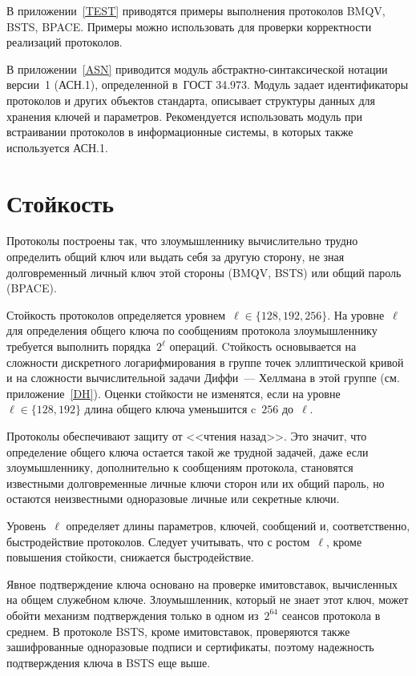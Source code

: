 В приложении~\ref{TEST} приводятся примеры выполнения 
протоколов BMQV, BSTS, BPACE.
Примеры можно использовать для проверки корректности реализаций 
протоколов.

В приложении~\ref{ASN} приводится модуль
абстрактно-синтаксической нотации версии~1 (АСН.1),
определенной в~ГОСТ 34.973.
Модуль задает идентификаторы протоколов и других объектов 
стандарта, описывает структуры данных для хранения 
ключей и параметров.
%
Рекомендуется использовать модуль 
при встраивании протоколов в информационные системы, 
в которых также используется АСН.1.

\section{Стойкость}\label{COMMON.Strength}

Протоколы построены так, что злоумышленнику 
вычислительно трудно определить общий ключ или 
выдать себя за другую сторону, не зная долговременный 
личный ключ этой стороны (BMQV, BSTS) или общий пароль (BPACE).

Стойкость протоколов определяется уровнем~$\ell\in\{128,192,256\}$.
%
На уровне~$\ell$ для определения общего ключа по сообщениям
протокола злоумышленнику требуется выполнить 
порядка~$2^\ell$ операций. 
%
Cтойкость основывается на сложности дискретного логарифмирования 
в группе точек эллиптической кривой и на сложности вычислительной задачи 
Диффи~--- Хеллмана в этой группе (см. приложение~\ref{DH}).
%
Оценки стойкости не изменятся, если на уровне~$\ell\in\{128,192\}$ длина общего
ключа уменьшится c~$256$ до~$\ell$.

Протоколы обеспечивают защиту от <<чтения назад>>. 
Это значит, что определение общего ключа остается такой же трудной
задачей, даже если злоумышленнику, дополнительно к сообщениям протокола,
становятся известными долговременные личные ключи сторон или
их общий пароль, но остаются неизвестными одноразовые 
личные или секретные ключи.
%


Уровень~$\ell$ определяет длины параметров, 
ключей, сообщений и, соответственно, быстродействие протоколов. 
%
Следует учитывать, что с ростом~$\ell$, кроме повышения стойкости,
снижается быстродействие.

Явное подтверждение ключа основано на проверке имитовставок,
вычисленных на общем служебном ключе. 
Злоумышленник, который не знает этот ключ, 
может обойти механизм подтверждения только в одном из~$2^{64}$ сеансов
протокола в среднем. 
%
В протоколе BSTS, кроме имитовставок, 
проверяются также зашифрованные одноразовые подписи и сертификаты, 
поэтому надежность подтверждения ключа в BSTS еще выше.

